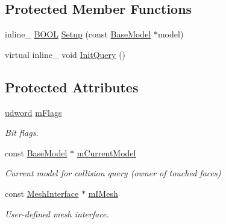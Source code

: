 \subsection*{Protected Member Functions}
\begin{DoxyCompactItemize}
\item 
inline\+\_\+ \hyperlink{IceTypes_8h_a050c65e107f0c828f856a231f4b4e788}{B\+O\+OL} \hyperlink{classOpcode_1_1Collider_aa4d882d312992243a98a63ea1fa75a4f}{Setup} (const \hyperlink{classOpcode_1_1BaseModel}{Base\+Model} $\ast$model)
\item 
virtual inline\+\_\+ void \hyperlink{classOpcode_1_1Collider_af53b15341c03e4cc0cc98342cb9a36d1}{Init\+Query} ()
\end{DoxyCompactItemize}
\subsection*{Protected Attributes}
\begin{DoxyCompactItemize}
\item 
\hyperlink{IceTypes_8h_a44c6f1920ba5551225fb534f9d1a1733}{udword} \hyperlink{classOpcode_1_1Collider_a8d4d15540af3e9150f573a68e8cf8492}{m\+Flags}\hypertarget{classOpcode_1_1Collider_a8d4d15540af3e9150f573a68e8cf8492}{}\label{classOpcode_1_1Collider_a8d4d15540af3e9150f573a68e8cf8492}

\begin{DoxyCompactList}\small\item\em Bit flags. \end{DoxyCompactList}\item 
const \hyperlink{classOpcode_1_1BaseModel}{Base\+Model} $\ast$ \hyperlink{classOpcode_1_1Collider_a28e87e54243aae73a30eff2f95e74a36}{m\+Current\+Model}\hypertarget{classOpcode_1_1Collider_a28e87e54243aae73a30eff2f95e74a36}{}\label{classOpcode_1_1Collider_a28e87e54243aae73a30eff2f95e74a36}

\begin{DoxyCompactList}\small\item\em Current model for collision query (owner of touched faces) \end{DoxyCompactList}\item 
const \hyperlink{classOpcode_1_1MeshInterface}{Mesh\+Interface} $\ast$ \hyperlink{classOpcode_1_1Collider_a9d90401184dc5526f9ce7d94b911fabe}{m\+I\+Mesh}\hypertarget{classOpcode_1_1Collider_a9d90401184dc5526f9ce7d94b911fabe}{}\label{classOpcode_1_1Collider_a9d90401184dc5526f9ce7d94b911fabe}

\begin{DoxyCompactList}\small\item\em User-\/defined mesh interface. \end{DoxyCompactList}\end{DoxyCompactItemize}


